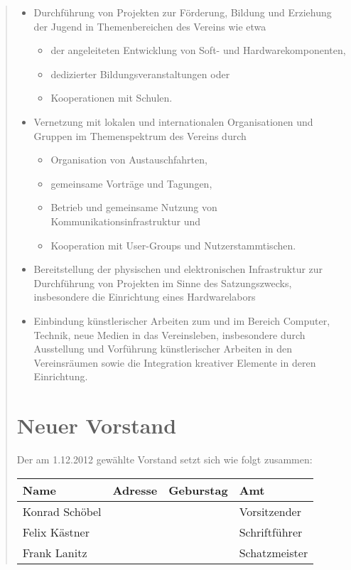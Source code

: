 \documentclass{scrartcl}
\begin{document}
\begin{quote}
\begin{enumerate}
\begin{itemize}
		\item Durchführung von Projekten zur Förderung, Bildung und Erziehung
			der Jugend in Themenbereichen des Vereins wie etwa
			\begin{itemize}
				\item der angeleiteten Entwicklung von Soft- und Hardwarekomponenten,
				\item dedizierter Bildungsveranstaltungen oder
				\item Kooperationen mit Schulen.
		\end{itemize}

		\item Vernetzung mit lokalen und internationalen Organisationen und
			Gruppen im Themenspektrum des Vereins durch
			\begin{itemize}
				\item Organisation von Austauschfahrten,
				\item gemeinsame Vorträge und Tagungen,
				\item Betrieb und gemeinsame Nutzung von
					Kommunikationsinfrastruktur und
				\item Kooperation mit User-Groups und Nutzerstammtischen.
			\end{itemize}

		\item Bereitstellung der physischen und elektronischen Infrastruktur zur
			Durchführung von Projekten im Sinne des Satzungszwecks,
			insbesondere die Einrichtung eines Hardwarelabors

		\item Einbindung künstlerischer Arbeiten zum und im Bereich Computer,
			Technik, neue Medien in das Vereinsleben, insbesondere durch
			Ausstellung und Vorführung künstlerischer Arbeiten in den
			Vereinsräumen sowie die Integration kreativer Elemente in
			deren Einrichtung.
	\end{itemize}
\end{enumerate}
\newpage 
\section{Neuer Vorstand}

Der am 1.12.2012 gewählte Vorstand setzt sich wie folgt zusammen: 

\label{sec:neuer_vorstand}
\begin{table}[h!]
	\centering
	\begin{tabular}{l|l|c|l}
		\textbf{Name} & \textbf{Adresse} & \textbf{Geburstag} & \textbf{Amt} \\ \hline
		Konrad Schöbel & & & Vorsitzender \\
		Felix Kästner & & & Schriftführer \\
		Frank Lanitz & & & Schatzmeister 
	\end{tabular}
\end{table}
\end{quote}
\end{document}
